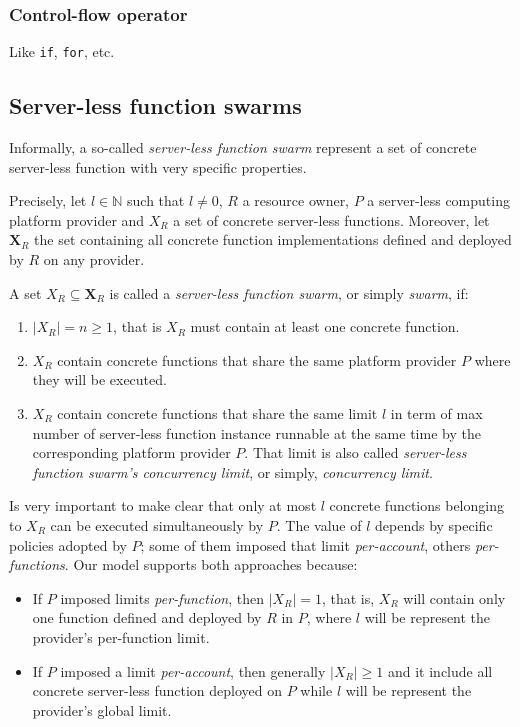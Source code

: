 \documentclass[10pt,a4paper]{article}
\begin{document}
\subsubsection{Control-flow operator}

Like \texttt{if}, \texttt{for}, etc.

\subsection{Server-less function swarms}

Informally, a so-called \textit{server-less function swarm} represent a set of concrete server-less function with very specific properties.

Precisely, let $l \in \mathbb{N}$ such that $l \neq 0$, $R$ a resource owner, $P$ a server-less computing platform provider and  $X_R$ a set of concrete server-less functions. Moreover, let $\textbf{X}_R$ the set containing all concrete function implementations defined and deployed by $R$ on any provider. 

A set $X_R \subseteq \textbf{X}_R$ is called a \textit{server-less function swarm}, or simply \textit{swarm}, if:

\begin{enumerate}
\item $|X_{R}| = n \geq 1$, that is $X_{R}$ must contain at least one concrete function.
\item $X_{R}$ contain concrete functions that share the same platform provider $P$ where they will be executed.
\item $X_{R}$ contain concrete functions that share the same limit $l$ in term of max number of server-less function instance runnable at the same time by the corresponding platform provider $P$. That limit is also called \textit{server-less function swarm's concurrency limit}, or simply, \textit{concurrency limit}. 
\end{enumerate}

Is very important to make clear that only at most $l$ concrete functions belonging to $X_R$ can be executed simultaneously by $P$. The value of $l$ depends by specific policies adopted by $P$; some of them imposed that limit \textit{per-account}, others \textit{per-functions}. Our model supports both approaches because:

\begin{itemize}

\item If $P$ imposed limits \textit{per-function}, then $|X_{R}| = 1$, that is, $X_{R}$ will contain only one function defined and deployed by $R$ in $P$, where $l$ will be represent the provider's per-function limit.

\item If $P$ imposed a limit \textit{per-account}, then generally $|X_{R}| \geq 1$ and it include all concrete server-less function deployed on $P$ while $l$ will be represent the provider's global limit. 
\end{itemize}
\end{document}

